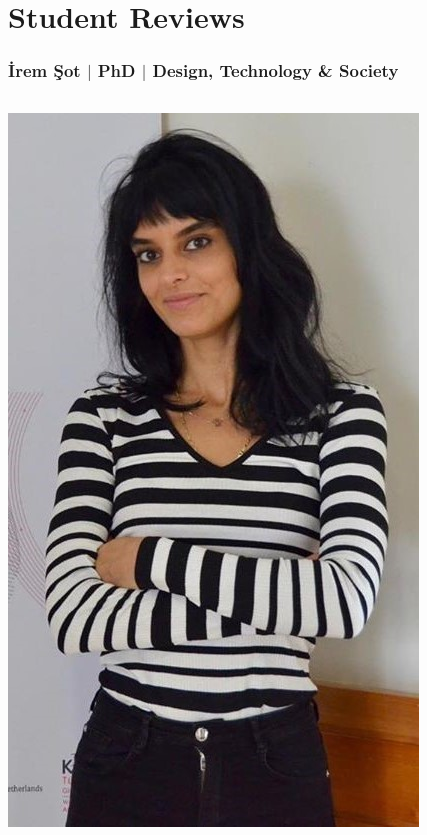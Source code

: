     \section{Student Reviews}
      \begin{frame}
        \frametitle{İrem Şot $\mid$ PhD $\mid$ Design, Technology \& Society}
        \vspace{-4mm}
        \begin{columns}
          \begin{column}{0.3\textwidth}
            \centering
            \includegraphics[width=\textwidth]{images/isot.jpg}

\end{column}
\end{columns}
\end{frame}
